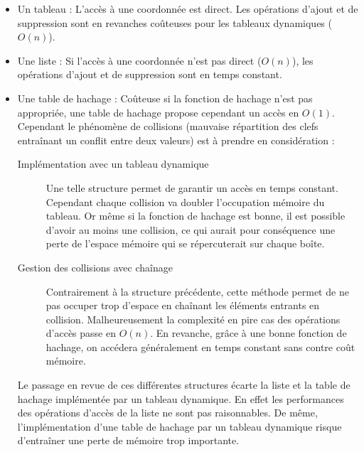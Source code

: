 \begin{itemize}
\item
  Un tableau : L'accès à une coordonnée est direct. Les opérations d'ajout et de suppression sont en revanches coûteuses pour les tableaux dynamiques ($O(n)$).
\item
  Une liste : Si l'accès à une coordonnée n'est pas direct ($O(n)$), les opérations d'ajout et de suppression sont en temps constant.
\item
  Une table de hachage : Coûteuse si la fonction de hachage n'est pas appropriée, une table de hachage propose cependant un accès en $O(1)$.  Cependant le phénomène de collisions (mauvaise répartition des clefs entraînant un conflit entre deux valeurs) est à prendre en considération :

\begin{description}
\item[Implémentation avec un tableau dynamique] Une telle structure permet de garantir un accès en temps constant. Cependant chaque collision va doubler l'occupation mémoire du tableau. Or même si la fonction de hachage est bonne, il est possible d'avoir au moins une collision, ce qui aurait pour conséquence une perte de l'espace mémoire qui se répercuterait sur chaque boîte.
\item[Gestion des collisions avec chaînage] Contrairement à la structure précédente, cette méthode permet de ne pas occuper trop d'espace en chaînant les éléments entrants en collision. Malheureusement la complexité en pire cas des opérations d'accès passe en $O(n)$. En revanche, grâce à une bonne fonction de hachage, on accédera généralement en temps constant sans contre coût mémoire. 
\end{description}

Le passage en revue de ces différentes structures écarte la liste et la table de hachage implémentée par un tableau dynamique. En effet les performances des opérations d'accès de la liste ne sont pas raisonnables. De même, l'implémentation d'une table de hachage par un tableau dynamique risque d'entraîner une perte de mémoire trop importante.

\end{itemize}

